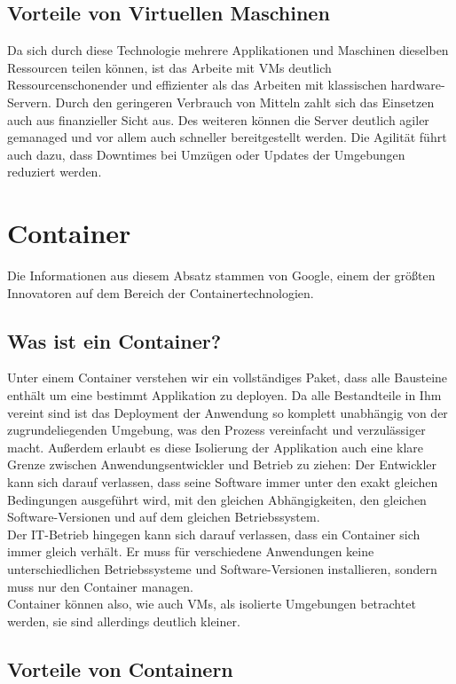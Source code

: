 \subsection{Vorteile von Virtuellen Maschinen}
Da sich durch diese Technologie mehrere Applikationen und Maschinen dieselben Ressourcen teilen können, ist das Arbeite mit \ac{VM}s deutlich Ressourcenschonender und effizienter als das Arbeiten mit klassischen hardware-Servern.
Durch den geringeren Verbrauch von Mitteln zahlt sich das Einsetzen auch aus finanzieller Sicht aus.
Des weiteren können die Server deutlich agiler gemanaged und vor allem auch schneller bereitgestellt werden.
Die Agilität führt auch dazu, dass Downtimes bei Umzügen oder Updates der Umgebungen reduziert werden.


\section{Container}
Die Informationen aus diesem Absatz stammen von Google\cite{containers}, einem der größten Innovatoren auf dem Bereich der Containertechnologien.
\subsection{Was ist ein Container?}
Unter einem Container verstehen wir ein vollständiges Paket, dass alle Bausteine enthält um eine bestimmt Applikation zu deployen.
Da alle Bestandteile in Ihm vereint sind ist das Deployment der Anwendung so komplett unabhängig von der zugrundeliegenden Umgebung, was den Prozess vereinfacht und verzulässiger macht.
Außerdem erlaubt es diese Isolierung der Applikation auch eine klare Grenze zwischen Anwendungsentwickler und Betrieb zu ziehen:
Der Entwickler kann sich darauf verlassen, dass seine Software immer unter den exakt gleichen Bedingungen ausgeführt wird, mit den gleichen Abhängigkeiten, den gleichen Software-Versionen und auf dem gleichen Betriebssystem.
\\
Der IT-Betrieb hingegen kann sich darauf verlassen, dass ein Container sich immer gleich verhält. 
Er muss für verschiedene Anwendungen keine unterschiedlichen Betriebssysteme und Software-Versionen installieren, sondern muss nur den Container managen.
\\
Container können also, wie auch \ac{VM}s, als isolierte Umgebungen betrachtet werden, sie sind allerdings deutlich kleiner.

\subsection{Vorteile von Containern}

